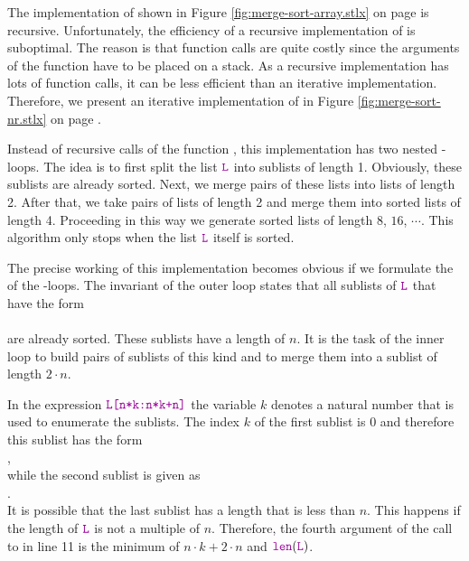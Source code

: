 \noindent
The implementation of  shown in Figure \ref{fig:merge-sort-array.stlx} on page
\pageref{fig:merge-sort-array.stlx} is recursive.  Unfortunately, the efficiency of a recursive
implementation of  is suboptimal.  The reason is that function calls are quite
costly since the arguments of the function have to be placed on a stack.  As a recursive
implementation has lots of function calls, it can be less efficient than an iterative
implementation.  Therefore, we present an iterative implementation of  in Figure
\ref{fig:merge-sort-nr.stlx} on page \pageref{fig:merge-sort-nr.stlx}.

Instead of recursive calls of the function , this implementation has two nested 
-loops.  The idea is to first split the list $\mytt{L}$ into sublists of length 1.
Obviously, these sublists are already sorted.  Next, we merge pairs of these lists into lists of
length 2.  After that, we take pairs of lists of length 2 and merge them into sorted lists of length
4. Proceeding in this way we generate sorted lists of length
$8$, $16$, $\cdots$.  This algorithm only stops when the list $\mytt{L}$ itself is sorted.

The precise working of this implementation becomes obvious if we formulate the  of the
-loops.  The invariant of the outer loop states that all sublists of $\mytt{L}$ 
that have the form
\\[0.2cm]
\hspace*{1.3cm}
\\[0.2cm]
are already sorted.  These sublists have a length of $n$.  It is the task of the inner  loop to build
pairs of sublists of this kind and to merge them into a sublist of length $2 \cdot n$.

In the expression $\mytt{L[n*k:n*k+n]}$ the variable $k$ denotes a natural
number that is used to enumerate the sublists.  The index $k$ of the first sublist is $0$ and
therefore this sublist has the form
\\[0.2cm]
\hspace*{1.3cm}
,
\\[0.2cm]
while the second sublist is given as
\\[0.2cm]
\hspace*{1.3cm}
.
\\[0.2cm]
It is possible that the last sublist has a length that is less than $n$.  This happens if the length
of $\mytt{L}$ is not a multiple of $n$.  Therefore, the fourth argument of the call to 
in line 11 is the minimum of $n\cdot k + 2\cdot n$ and $\mytt{len}(\mytt{L})$.


